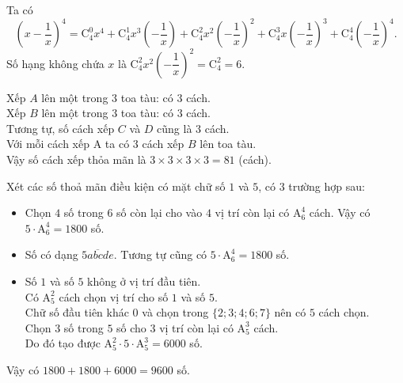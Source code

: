 \begin{loigiaibt}{1}
  Ta có $$\left (x-\dfrac {1}{x}\right )^4=\mathrm {C}_4^0 x^4+\mathrm {C}_4^1 x^3\left (-\dfrac {1}{x}\right )+\mathrm {C}_4^2 x^2\left (-\dfrac {1}{x}\right )^2+\mathrm {C}_4^3 x\left (-\dfrac {1}{x}\right )^3+\mathrm {C}_4^4\left (-\dfrac {1}{x}\right )^4.$$ Số hạng không chứa $x$ là $\mathrm {C}_4^2 x^2\left (-\dfrac {1}{x}\right )^2=\mathrm {C}_4^2=6$.  
\end{loigiaibt}
\begin{loigiaibt}{2}
 Xếp $A$ lên một trong $3$ toa tàu: có $3$ cách.\\ Xếp $B$ lên một trong $3$ toa tàu: có $3$ cách.\\ Tương tự, số cách xếp $C$ và $D$ cũng là $3$ cách.\\ Với mỗi cách xếp $\mathrm {A}$ ta có $3$ cách xếp $B$ lên toa tàu.\\ Vậy số cách xếp thỏa mãn là $3 \times 3 \times 3 \times 3=81$ (cách).  
\end{loigiaibt}
\begin{loigiaibt}{3}
 Xét các số thoả mãn điều kiện có mặt chữ số $1$ và $5$, có $3$ trường hợp sau:\begin {itemize} \item Chọn $4$ số trong $6$ số còn lại cho vào $4$ vị trí còn lại có $\mathrm {A}_6^4$ cách. Vậy có $5 \cdot \mathrm {A}_6^4=1800$ số. \item Số có dạng $\overline {5 a b c d e}$. Tương tự cũng có $5 \cdot \mathrm {A}_6^4=1800$ số. \item Số $1$ và số $5$ không ở vị trí đầu tiên.\\ Có $\mathrm {A}_5^2$ cách chọn vị trí cho số $1$ và số $5$.\\ Chữ số đầu tiên khác $0$ và chọn trong $\{2 ; 3 ; 4 ; 6 ; 7\}$ nên có $5$ cách chọn.\\ Chọn $3$ số trong $5$ số cho $3$ vị trí còn lại có $\mathrm {A}_5^3$ cách.\\ Do đó tạo được $\mathrm {A}_5^2 \cdot 5 \cdot \mathrm {A}_5^3=6000$ số. \end {itemize} Vậy có $1800+1800+6000=9600$ số. 
\end{loigiaibt}

